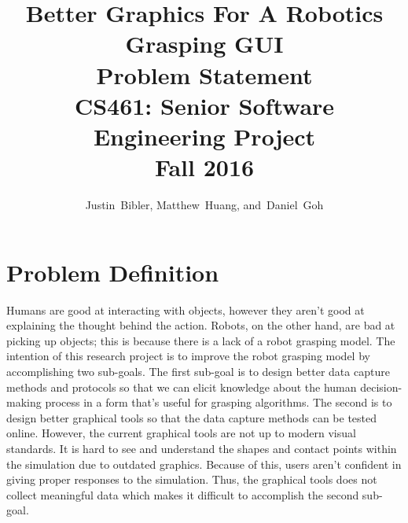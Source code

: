 \documentclass[10pt,journal,compsoc]{IEEEtran}
\begin{document}
\onecolumn
\begin{titlepage}
\title{Better Graphics For A Robotics Grasping GUI\\ Problem Statement \\  [0.5em] 
	\large CS461: Senior Software Engineering Project \\ Fall 2016}

\author{Justin~Bibler,
        Matthew~Huang,
        and~Daniel~Goh}
		

\maketitle

\end{titlepage}

\section{Problem Definition}
Humans are good at interacting with objects, however they aren't good at explaining the thought behind the action.
Robots, on the other hand, are bad at picking up objects; this is because there is a lack of a robot grasping model.
The intention of this research project is to improve the robot grasping model by accomplishing two sub-goals.
The first sub-goal is to design better data capture methods and protocols so that we can elicit knowledge about the human decision-making process in a form that's useful for grasping algorithms.
The second is to design better graphical tools so that the data capture methods can be tested online.
However, the current graphical tools are not up to modern visual standards.
It is hard to see and understand the shapes and contact points within the simulation due to outdated graphics.
Because of this, users aren’t confident in giving proper responses to the simulation.
Thus, the graphical tools does not collect meaningful data which makes it difficult to accomplish the second sub-goal.
\end{document}
